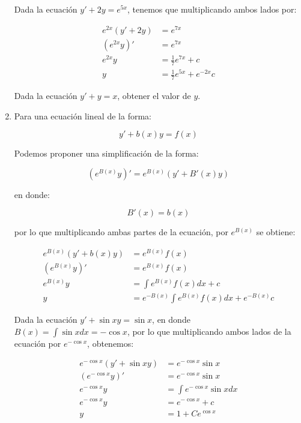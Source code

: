 \begin{enumerate}
			\begin{ejemplo}
				Dada la ecuación $y' + 2y = e^{5x}$, tenemos que multiplicando ambos lados por:

				\begin{align*}
					e^{2x}(y' + 2y) &= e^{7x} \\
					(e^{2x} y)' &= e^{7x} \\
					e^{2x} y &= \frac{1}{7} e^{7x} + c \\
					y &= \frac{1}{7} e^{5x} + e^{-2x} c
				\end{align*}
			\end{ejemplo}

			\begin{ejercicio}
				Dada la ecuación $y' + y = x$, obtener el valor de $y$.
			\end{ejercicio}

			\item Para una ecuación lineal de la forma:

			\begin{equation*}
				y' + b(x) y = f(x)
			\end{equation*}

			Podemos proponer una simplificación de la forma:

			\begin{equation*}
				(e^{B(x)} y)' = e^{B(x)}(y' + B'(x) y)
			\end{equation*}

			en donde:

			\begin{equation*}
				B'(x) = b(x)
			\end{equation*}

			por lo que multiplicando ambas partes de la ecuación, por $e^{B(x)}$ se obtiene:

			\begin{align*}
				e^{B(x)}(y' + b(x) y) &= e^{B(x)}f(x) \\
				(e^{B(x)} y)' &= e^{B(x)} f(x) \\
				e^{B(x)} y &= \int e^{B(x)} f(x) dx + c \\
				y &= e^{-B(x)} \int e^{B(x)} f(x) dx + e^{-B(x)}c
			\end{align*}

			\begin{ejemplo}
				Dada la ecuación $y' + \sin{x} y = \sin{x}$, en donde $B(x) = \int \sin{x} dx = - \cos{x}$, por lo que multiplicando ambos lados de la ecuación por $e^{-\cos{x}}$, obtenemos:

				\begin{align*}
					e^{-\cos{x}}(y' + \sin{x} y) &= e^{-\cos{x}} \sin{x} \\
					(e^{-\cos{x}} y)' &= e^{-\cos{x}} \sin{x} \\
					e^{-\cos{x}} y &= \int e^{-\cos{x}} \sin{x} dx \\
					e^{-\cos{x}} y &= e^{-\cos{x}} + c \\
					y &= 1 + Ce^{\cos{x}}
				\end{align*}
			\end{ejemplo}


\end{enumerate}

